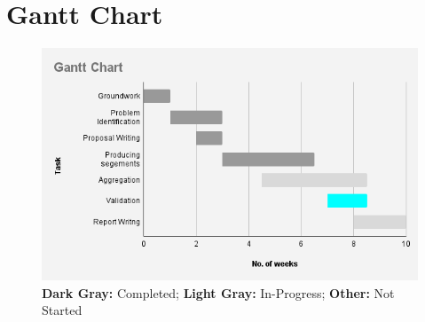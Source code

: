 \documentclass{article}
\begin{document}
\section{Gantt Chart}
\begin{figure}[ht]
\includegraphics[width = 15cm]{Gantt Chart .png}
\caption{\textbf{Dark Gray:} Completed; \textbf{Light Gray:} In-Progress; \textbf{Other:} Not Started}
\end{figure}
\end{document}
